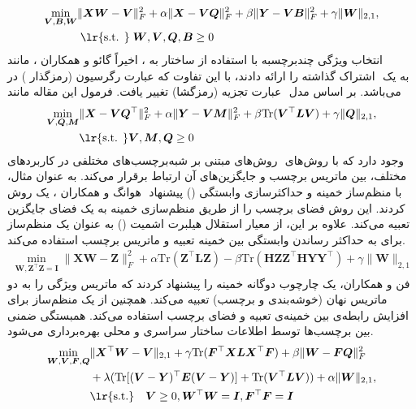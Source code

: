 	\begin{align}\label{SCMFS}
		\min_{\bm{V} ,\bm{B},\bm{W}}&\lVert\bm{XW}-\bm{V}\rVert^2_F + \alpha\lVert\bm{X}-\bm{V}\bm{Q}\rVert^2_F + 
		\beta\lVert\bm{Y}-\bm{V}\bm{B}\rVert^2_F +\gamma\lVert\bm{W}\lVert_{2,1},\nonumber\\&
		\;{\text{\lr{s.t. }}\;}{\bm{W},\bm{V},\bm{Q},\bm{B}}\geq 0
	\end{align}  
	اخیراً گائو و همکاران \cite{gao2021multilabel}، مانند ‎، انتخاب ویژگی چندبرچسبه با استفاده از ساختار به اشتراک گذاشته را ارائه دادند، با این تفاوت که عبارت رگرسیون (رمزگذار ) در ‎‎ به یک عبارت تجزیه (رمزگشا) تغییر یافت. فرمول این مقاله مانند ‎‎ بر اساس مدل‎ 
	.‎می‌باشد
	\begin{align}
		\min_{\bm{V},\bm{Q},\bm{M}}&\lVert\bm{X}-\bm{V}\bm{Q}^\top\rVert^2_F + \alpha \lVert\bm{Y}-\bm{V}\bm{M}\rVert^2_F +\beta\mathrm{Tr}(\bm{V}^\top \bm{LV}) + \gamma\lVert\bm{Q}\lVert_{2,1},\nonumber\\&
		{\text{\lr{s.t. }}}{\bm{V},\bm{M},\bm{Q}}\geq 0
	\end{align}
	روش‌های مبتنی بر شبه‌برچسب‌های مختلفی در کاربردهای ‎‎ وجود دارد که با روش‌های مختلف، بین ماتریس برچسب و جایگزین‌های آن ارتباط برقرار می‌کند. به عنوان مثال، هوانگ و همکاران \cite{huang2021multi}، یک روش ‎‎ با منظم‌ساز خمینه و حداکثرسازی وابستگی 
	() 
	پیشنهاد کردند. این روش فضای برچسب را از طریق منظم‌سازی خمینه به یک فضای جایگزین تعبیه می‌کند. علاوه بر این، از معیار استقلال هیلبرت اشمیت 
	() 
	به عنوان یک منظم‌ساز برای به حداکثر رساندن وابستگی بین خمینه تعبیه و ماتریس برچسب استفاده می‌کند.
	\begin{align}
		\min_{\bm{W},\bm{Z}^\top\bm{Z}={\bm{I}}}\lVert{\bm{XW}-\bm{Z}}\lVert^2_F + \alpha\mathrm{Tr}(\bm{Z}^\top \bm{LZ}) - \beta\mathrm{Tr}(\bm{HZ}\bm{Z}^\top \bm{HY}\bm{Y}^\top)+ \gamma\lVert{\bm{W}}\lVert_{2,1}
	\end{align}
	فن و همکاران\cite{fan2021manifold}، یک چارچوب دوگانه خمینه را پیشنهاد کردند که ماتریس ویژگی را به دو ماتریس نهان (خوشه‌بندی و برچسب) تعبیه می‌کند. همچنین از یک منظم‌ساز برای افزایش رابطه‌ی بین خمینه‌ی تعبیه و فضای برچسب استفاده می‌کند. همبستگی ضمنی بین برچسب‌ها توسط اطلاعات ساختار سراسری و محلی بهره‌برداری می‌شود.
	\begin{align}
		\min_{\bm{W} , \bm{V}, \bm{F},\bm{Q}}&\lVert \bm{X}^\top\bm{W} - \bm{V} \rVert_{2,1} +\gamma\mathrm{Tr}(\bm{F}^\top\bm{XLX}^\top\bm{F}) + \beta \lVert\bm{W}-\bm{FQ}\lVert^2_F \nonumber\\
		&+\lambda(\mathrm{Tr}[(\bm{V}-\bm{Y})^\top \bm{E}(\bm{V}-\bm{Y})] +\mathrm{Tr}(\bm{V}^\top \bm{LV})) + \alpha \lVert\bm{W}\lVert_{2,1},\nonumber\\
		&{\text{\lr{s.t.}}\quad}\bm{V}\geq 0, \bm{W}^\top \bm{W}=\bm{I},  \bm{F}^\top \bm{F}=\bm{I}
	\end{align}
